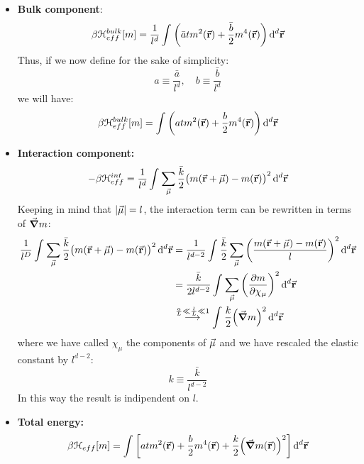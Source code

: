 \documentclass[../main/main.tex]{subfiles}
\begin{document}
\begin{itemize}
\item \textbf{Bulk component}:
\begin{equation}
  \beta \mathcal{H}_{eff}^{bulk} [m] =  \frac{1}{l^d} \int_{}^{} \qty( \bar{a} t m^2 (\va{r})+ \frac{\bar{b} }{2} m^4 (\va{r})  )  \dd[d]{\va{r}}
\end{equation}
Thus, if we now define for the sake of simplicity:
\begin{equation*}
  a \equiv \frac{\bar{a} }{l^d}, \quad b \equiv \frac{\bar{b} }{l^d}
\end{equation*}
we will have:
\begin{equation*}
  \beta \mathcal{H}_{eff}^{bulk} [m] = \int_{}^{} \qty( a t m^2 (\va{r})+ \frac{b }{2} m^4 (\va{r})  )  \dd[d]{\va{r}}
\end{equation*}


\item \textbf{Interaction component:}
\begin{equation}
  - \beta \mathcal{H}_{eff}^{int} =   \frac{1}{l^d} \int_{}^{}  \sum_{\va{\mu }}^{}  \frac{\bar{k} }{2} \big( m (\va{r}+\va{\mu }) - m(\va{r})\big)^2  \dd[d]{\va{r}}
 \end{equation}
 Keeping in mind that \( \abs{\va{\mu }}  = l \), the interaction term can be rewritten in terms of \( \va{\grad } m\):
\begin{equation*}
\begin{split}
\frac{1}{l^D} \int_{}^{}  \sum_{\va{\mu }}^{}  \frac{\bar{k} }{2} \big( m (\va{r}+\va{\mu }) - m(\va{r})\big)^2  \dd[d]{\va{r}} & = \frac{1}{l^{d-2}} \int_{}^{}
\frac{\bar{k} }{2} \sum_{\va{\mu }}^{}  \qty(\frac{m (\va{r}+\va{\mu }) - m(\va{r})}{l})^2 \dd[d]{\va{r}} \\
& = \frac{\bar{k} }{2l^{d-2}} \int_{}^{}
\sum_{\va{\mu }}^{}  \qty(\pdv{m}{ \chi  _ \mu } )^2 \dd[d]{\va{r}} \\
& \overset{\frac{a}{L} \ll \frac{l}{L} \ll 1}{\longrightarrow }  \int_{}^{}   \frac{k }{2} \qty(\va{\grad } m)^2  \dd[d]{\va{r}}
\end{split}
\end{equation*}
where we have called \( \chi _{\mu } \)  the components of \( \va{\mu } \) and we have rescaled the elastic constant by \( l^{d-2} \):
\begin{equation*}
  k \equiv  \frac{ \bar{k} }{l^{d-2}}
\end{equation*}
In this way the result is indipendent on \( l \).


\item \textbf{Total energy:}
\begin{equation}
  \beta \mathcal{H}_{eff} [m] = \int_{}^{}  \qty[a t m^2 (\va{r}) + \frac{b}{2} m^4 (\va{r}) + \frac{k}{2} \qty(\va{\grad } m (\va{r}))^2] \dd[d]{\va{r}}
\end{equation}
\end{itemize}
\end{document}
